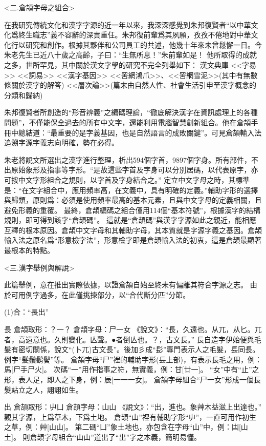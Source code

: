 \documentclass{article}
\begin{document}
<二.倉頡字母之組合>

在我研究傳統文化和漢字字源的近一年以來，我深深感覺到朱邦復賢者“以中華文化爲終生職志”義不容辭的深責重仼。朱邦復前輩爲其夙願，孜孜不倦地對中華文化行以研究和創作。根據其夥伴和公司員工的共述，他幾十年來未曾鬆懈一日。今朱老先生已近八十歲之高齡，子曰：“生無所息！”朱前輩如是！
他所取得的成就之多，世所罕見，其中關於漢文字學的研究不完全列舉如下：
漢文典庫
<<字易>>
<<詞易>>
<<漢字基因>>
<<罟網鴻爪>>、<<罟網雪泥>>(其中有無數條關於漢字的解答)
<<層次論>>(篇末由自然人性、社會生活引申至漢字概念的分類和歸納)

朱邦復賢者所創造的“形音辨義”之編碼理論，“徹底解決漢字在資訊處理上的各種問題”，不僅能保全過去的所有中文字，還能利用電腦智慧創新組合。他在倉頡手冊中總結道：“最重要的是字義基因，也是自然語言的成敗關鍵”。可見倉頡輸入法追溯字源字義志向明確，勢在必得。

朱老將說文所選出之漢字進行整理，析出594個字首，9897個字身。所有部件，不出原始象形及指事等字形。“是故這些字首及字身可以分別居碼，以代表原字，亦可按中文字形組合之規則，以字首及字身結合之。”
定立中文字母之時，其標準是：“在文字組合中，應用頻率高，在文義中，具有明確的定義。”輔助字形的選擇與歸類，原則爲：必須是使用頻率最高的基本元素，且與中文字母的定義相關，且避免形義的重覆。
最終，倉頡編碼之組合僅用114個“基本符號”，根據漢字的結構規則，即可得到該字“倉頡碼”。
這就是“倉頡碼”與漢字字源如此之親近，能相應互釋的根本原因。倉頡中文字母和其輔助字母，其本質就是字源字義之基因。倉頡輸入法之原名爲“形意檢字法”，形意檢字即是倉頡輸入法的初衷，這是倉頡最顯著最根本的特點。



<三.漢字舉例與解說>

此篇舉例，意在推出實際依據，以證倉頡自始至終未有偏離其符合字源之志。
由於可用例字過多，在此僅挑揀部分，以“合代斷分匹”分節。

(1)合：“長出”

長
倉頡取形：？一？
倉頡字母：尸一女
《說文》：“長，久遠也。从兀，从匕。兀者，高遠意也。久則變化。亾聲。●者倒亾也。？，古文長。”
長自造字伊始便與毛髮有密切關係，說文“(卜兀)古文長”。後加彡成“髟”專門表示人之毛髮，镸同長。例字“髮鬚鬍鬢”等。
倉頡字母“尸”裡的輔助字形(镸上部)，有表示長毛之用，例：馬[尸手尸火]。
次碼“一”用作指事之符，無實義，例：甘[廿一]。
“女”中有“止”之形，表人足，即人之下身，例：辰[一一一女]。
倉頡字母組合“尸一女”形成一個長髮站立之人，詡詡如生。

出
倉頡取形：屮凵
倉頡字母：山山
《說文》：“出，進也。象艸木益滋上出達也。”
觀其字源，上爲草木，下爲土地。
倉頡“山”裡有輔助字形“屮”，一直可用作初生之草，例：艸[山山]。
第二碼“凵”象土地也，亦包含在字母“山”中，例：凷[山土]。
則倉頡字母組合“山山”道出了“出”字之本義，簡明易懂。
\end{document}
